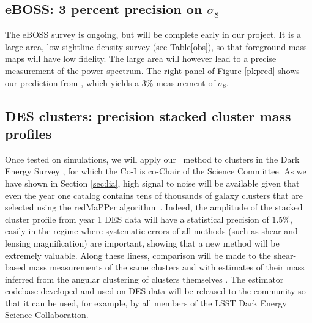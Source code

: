 \subsection{eBOSS: 3 percent precision on $\sigma_{8}$}
The eBOSS survey is ongoing, but will be complete early in our project.
It is a large area, low sightline density survey (see Table\ref{obs}), so
that foreground mass maps will have low fidelity. The large area will
however lead to a precise measurement of the power spectrum.
The right panel of Figure \ref{pkpred} shows our prediction from 
\cite{metcalfandcroft}, which yields a 3\% measurement of $\sigma_{8}$.

\subsection{DES clusters: precision stacked cluster mass profiles}

Once tested on simulations, we will apply our
\atf\  method to clusters in the Dark Energy Survey \cite{des2016},
for which the Co-I is co-Chair of the Science Committee. 
As we have shown in Section \ref{sec:lia}, high signal to noise will be
available given that even the year one catalog contains tens of  
thousands of galaxy clusters 
that are selected using the redMaPPer algorithm~\cite{melchior2017}.
Indeed, the amplitude of the stacked cluster profile from year 1 DES data
will have a statistical precision of $1.5 \%$, easily in the 
regime where systematic errors of all methods (such as shear and
lensing magnification) are important, showing that a new method will
be extremely valuable. Along these liness, comparison will 
be made to the shear-based
mass measurements of the same clusters \cite{simet2017} and with
estimates of their mass inferred from the angular clustering
of clusters themselves \cite{baxter2016}.
The estimator codebase developed and used on DES data will
be released to the community so that it can be used, for example, by
all members of the LSST Dark Energy Science Collaboration.
